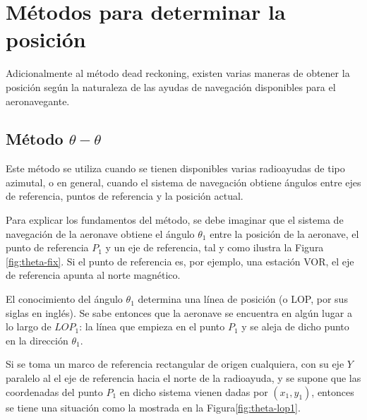 \documentclass[a4paper,12pt,twoside]{article}
\begin{document}
\section{M\'etodos para determinar la posici\'on \cite{Salazar_nav_aerea}}

Adicionalmente al m\'etodo dead reckoning,  existen varias maneras de obtener la posici\'on seg\'un la naturaleza de las ayudas de navegaci\'on disponibles para el aeronavegante. 


\subsection{M\'etodo $\theta-\theta$}

Este m\'etodo se utiliza cuando se tienen disponibles varias radioayudas de tipo azimutal, o en general, cuando el sistema de navegaci\'on obtiene \'angulos entre ejes de referencia, puntos de referencia y la posici\'on actual.

Para explicar los fundamentos del m\'etodo, se debe imaginar que el sistema de navegaci\'on de la aeronave obtiene el \'angulo $\theta_1$ entre la posici\'on de la aeronave, el punto de referencia $P_1$ y un eje de referencia, tal y como ilustra la Figura \ref{fig:theta-fix}. Si el punto de referencia es, por ejemplo, una estaci\'on VOR, el eje de referencia apunta al norte magn\'etico. 

El conocimiento del \'angulo $\theta_1$ determina una l\'inea de posici\'on (o LOP, por sus siglas en ingl\'es). Se sabe entonces que la aeronave se encuentra en alg\'un lugar a lo largo de $LOP_{1}$: la l\'inea que empieza en el punto $P_1$ y se aleja de dicho punto en la direcci\'on $\theta_1$.

Si se toma un marco de referencia rectangular de origen cualquiera, con su eje $Y$ paralelo al el eje de referencia hacia el norte de la radioayuda, y se supone que las coordenadas del punto $P_1$ en dicho sistema vienen dadas por $(x_1, y_1)$, entonces se tiene una situaci\'on como la mostrada en la Figura\ref{fig:theta-lop1}. 
\end{document}
